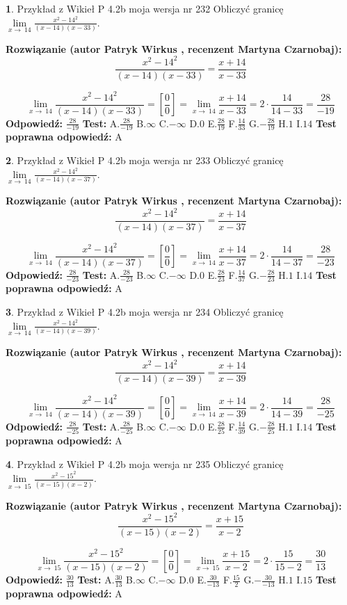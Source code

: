 \documentclass[12pt, a4paper]{article}
\theoremstyle{definition} %
\newtheorem{zad}{}
\newcommand{\zadStart}[1]{\begin{zad}#1\newline}
\newcommand{\zadStop}{\end{zad}}
\newcommand{\rozwStart}[2]{\noindent \textbf{Rozwiązanie (autor #1 , recenzent #2): }\newline}
\newcommand{\rozwStop}{\newline}
\newcommand{\odpStart}{\noindent \textbf{Odpowiedź:}\newline}
\newcommand{\odpStop}{\newline}
\newcommand{\testStart}{\noindent \textbf{Test:}\newline}
\newcommand{\testStop}{\newline}
\newcommand{\kluczStart}{\noindent \textbf{Test poprawna odpowiedź:}\newline}
\newcommand{\kluczStop}{\newline}
\begin{document}
\zadStart{Przykład z Wikieł P 4.2b moja wersja nr 232}
Obliczyć granicę $\lim\limits_{x\to\ 14}\frac{x^{2}-14^{2}}{(x-14)(x-33)}$.
\zadStop
\rozwStart{Patryk Wirkus}{Martyna Czarnobaj}
$$\frac{x^{2}-14^{2}}{(x-14)(x-33)}=\frac{x+14}{x-33}$$

$$\lim\limits_{x\to\ 14}\frac{x^{2}-14^{2}}{(x-14)(x-33)}=[\frac{0}{0}]=\lim\limits_{x\to\ 14}\frac{x+14}{x-33}=2 \cdot \frac{14}{14-33} = \frac{28}{-19}$$
\rozwStop
\odpStart
$\frac{28}{-19}$
\odpStop
\testStart
A.$\frac{28}{-19}$
B.$\infty$
C.$-\infty$
D.$0$
E.$\frac{28}{19}$
F.$\frac{14}{33}$
G.$-\frac{28}{19}$
H.$1$
I.$14$
\testStop
\kluczStart
A
\kluczStop



\zadStart{Przykład z Wikieł P 4.2b moja wersja nr 233}
Obliczyć granicę $\lim\limits_{x\to\ 14}\frac{x^{2}-14^{2}}{(x-14)(x-37)}$.
\zadStop
\rozwStart{Patryk Wirkus}{Martyna Czarnobaj}
$$\frac{x^{2}-14^{2}}{(x-14)(x-37)}=\frac{x+14}{x-37}$$

$$\lim\limits_{x\to\ 14}\frac{x^{2}-14^{2}}{(x-14)(x-37)}=[\frac{0}{0}]=\lim\limits_{x\to\ 14}\frac{x+14}{x-37}=2 \cdot \frac{14}{14-37} = \frac{28}{-23}$$
\rozwStop
\odpStart
$\frac{28}{-23}$
\odpStop
\testStart
A.$\frac{28}{-23}$
B.$\infty$
C.$-\infty$
D.$0$
E.$\frac{28}{23}$
F.$\frac{14}{37}$
G.$-\frac{28}{23}$
H.$1$
I.$14$
\testStop
\kluczStart
A
\kluczStop



\zadStart{Przykład z Wikieł P 4.2b moja wersja nr 234}
Obliczyć granicę $\lim\limits_{x\to\ 14}\frac{x^{2}-14^{2}}{(x-14)(x-39)}$.
\zadStop
\rozwStart{Patryk Wirkus}{Martyna Czarnobaj}
$$\frac{x^{2}-14^{2}}{(x-14)(x-39)}=\frac{x+14}{x-39}$$

$$\lim\limits_{x\to\ 14}\frac{x^{2}-14^{2}}{(x-14)(x-39)}=[\frac{0}{0}]=\lim\limits_{x\to\ 14}\frac{x+14}{x-39}=2 \cdot \frac{14}{14-39} = \frac{28}{-25}$$
\rozwStop
\odpStart
$\frac{28}{-25}$
\odpStop
\testStart
A.$\frac{28}{-25}$
B.$\infty$
C.$-\infty$
D.$0$
E.$\frac{28}{25}$
F.$\frac{14}{39}$
G.$-\frac{28}{25}$
H.$1$
I.$14$
\testStop
\kluczStart
A
\kluczStop



\zadStart{Przykład z Wikieł P 4.2b moja wersja nr 235}
Obliczyć granicę $\lim\limits_{x\to\ 15}\frac{x^{2}-15^{2}}{(x-15)(x-2)}$.
\zadStop
\rozwStart{Patryk Wirkus}{Martyna Czarnobaj}
$$\frac{x^{2}-15^{2}}{(x-15)(x-2)}=\frac{x+15}{x-2}$$

$$\lim\limits_{x\to\ 15}\frac{x^{2}-15^{2}}{(x-15)(x-2)}=[\frac{0}{0}]=\lim\limits_{x\to\ 15}\frac{x+15}{x-2}=2 \cdot \frac{15}{15-2} = \frac{30}{13}$$
\rozwStop
\odpStart
$\frac{30}{13}$
\odpStop
\testStart
A.$\frac{30}{13}$
B.$\infty$
C.$-\infty$
D.$0$
E.$\frac{30}{-13}$
F.$\frac{15}{2}$
G.$-\frac{30}{-13}$
H.$1$
I.$15$
\testStop
\kluczStart
A
\kluczStop
\end{document}
